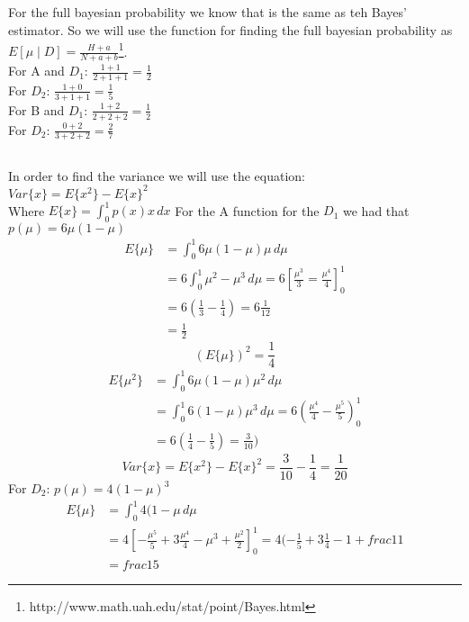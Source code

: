 \subsection{}
For the full bayesian probability we know that is the same as teh Bayes' estimator.
So we will use the function for finding the full bayesian probability as $E[\mu\mid D] = \frac{H+a}{N+a+b}$\footnote{http://www.math.uah.edu/stat/point/Bayes.html}.\\
For A and $D_1$: $\frac{1+1}{2+1+1} = \frac{1}{2}$\\
For $D_2$: $\frac{1+0}{3+1+1} = \frac{1}{5}$\\
For B and $D_1$: $\frac{1+2}{2+2+2} = \frac{1}{2}$\\
For $D_2$: $\frac{0+2}{3+2+2} = \frac{2}{7}$\\
\subsection{}
In order to find the variance we will use the equation:\\
$Var\{x\} = E\{x^2\} - E\{x\}^2$\\
Where $E\{x\} = \int_0^1 p(x)x \,dx$
For the A function for the $D_1$ we had that $p(\mu) = 6\mu(1-\mu)$
\begin{align*}
E\{\mu\} &= \int_0^1 6\mu(1-\mu)\mu \,d\mu \\
&= 6 \int_0^1 \mu^2-\mu^3 \,d\mu
 = 6 [\frac{\mu^3}{3} = \frac{\mu^4}{4}]_0^1 \\
&= 6 (\frac{1}{3} - \frac{1}{4})
 = 6 \frac{1}{12} \\
&= \frac{1}{2}
\end{align*}
\begin{equation*}
(E\{\mu\})^2 = \frac{1}{4}
\end{equation*}
\begin{align*}
E\{\mu^2\} &= \int_0^1 6\mu(1-\mu)\mu^2 \,d\mu\\
&= \int_0^1 6(1-\mu)\mu^3 \,d\mu = 6(\frac{\mu^4}{4}-\frac{\mu^5}{5})_0^1\\
&= 6(\frac{1}{4}-\frac{1}{5}) = \frac{3}{10})
\end{align*}
\begin{equation*}
Var\{x\} =E\{x^2\} - E\{x\}^2  = \frac{3}{10} - \frac{1}{4} = \frac{1}{20}
\end{equation*}
For $D_2$: $p(\mu) = 4(1-\mu)^3$
\begin{align*}
E\{\mu\} &= \int_0^1 4(1-\mu \,d\mu \\
&= 4 [-\frac{\mu^5}{5} + 3\frac{\mu^4}{4} - \mu^3 + \frac{\mu^2}{2}]_0^1
= 4 (-\frac{1}{5} + 3\frac{1}{4}  -1 + frac{1}{1} \\
&= frac{1}{5}
\end{align*}
